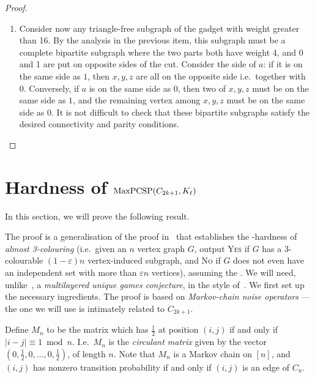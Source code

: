 \documentclass[a4paper,11pt, DIV=11]{scrartcl}
\renewcommand{\epsilon}{\varepsilon}
\DeclareMathOperator{\maxPCSP}{\textup{MaxPCSP}}
\theoremstyle{plain}
\theoremstyle{definition}
\begin{document}
\begin{proof}
\begin{enumerate}
    \item Consider now any triangle-free subgraph of the gadget with weight greater than 16. By the analysis in the previous item, this subgraph must be a complete bipartite subgraph where the two parts both have weight 4, and 0 and 1 are put on opposite sides of the cut. Consider the side of $a$: if it is on the same side as $1$, then $x, y, z$ are all on the opposite side i.e.~together with 0. Conversely, if $a$ is on the same side as $0$, then two of $x, y, z$ must be on the same side as $1$, and the remaining vertex among $x, y, z$ must be on the same side as $0$. It is not difficult to check that these bipartite subgraphs satisfy the desired connectivity and parity conditions.\qedhere
    \end{enumerate}
\end{proof}

\newpage

\section{\texorpdfstring{Hardness of $\maxPCSP(C_{2k+1}, K_\ell)$}{Hardness of maxPCSP(C2k+1, Kl)}}
\label{sec:ugchardness}

In this section, we will prove the following result.

\thmUGChardness*

The proof is a generalisation of the proof
in~\cite{Dinur09:sicomp} that establishes the \NP-hardness of \emph{almost
3-colouring} (i.e.~given an $n$ vertex graph $G$, output \textsc{Yes} if $G$ has
a 3-colourable $(1 - \epsilon)n$ vertex-induced subgraph, and \textsc{No} if $G$
does not even have an independent set with more than $\epsilon n$ vertices), assuming the \UGC.
We will need, unlike~\cite{Dinur09:sicomp}, a
\emph{multilayered unique games conjecture}, in the style of~\cite{BWZ21}. We
first set up the necessary ingredients. The proof is based on \emph{Markov-chain noise operators} --- the one we will use is intimately related to $C_{2k + 1}$.

\begin{definition}
    Define $M_{n}$ to be the matrix which has $\frac{1}{2}$ at position $(i, j)$ if and only if $|i - j| \equiv 1 \bmod n$. I.e.~$M_{n}$ is the \emph{circulant matrix} given by the vector $(0, \frac{1}{2}, 0, \ldots, 0, \frac{1}{2})$, of length $n$. Note that $M_{n}$ is a Markov chain on $[n]$, and $(i, j)$ has nonzero transition probability if and only if $(i, j)$ is an edge of $C_{n}$.
\end{definition}
\end{document}
